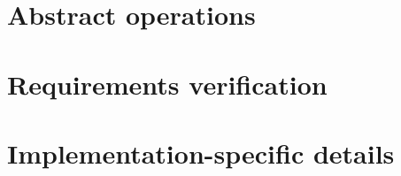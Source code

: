 \section{Abstract operations} %
\label{sec:AbstractOp}

\section{Requirements verification} %
\label{sec:RequirementVerif}

\section{Implementation-specific details}
\label{sec:ImplSpecDetails}